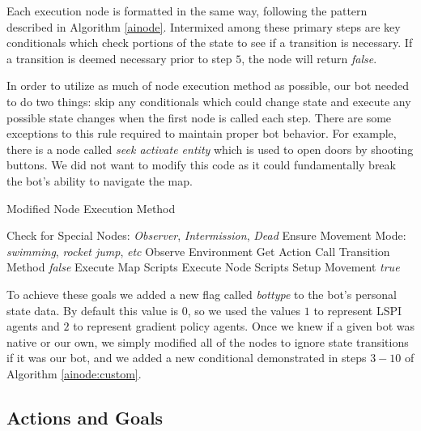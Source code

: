Each execution node is formatted in the same way, following the pattern described in Algorithm \ref{ainode}. Intermixed among these primary steps are key conditionals which check portions of the state to see if a transition is necessary. If a transition is deemed necessary prior to step $5$, the node will return \emph{false}.

In order to utilize as much of node execution method as possible, our bot needed to do two things: skip any conditionals which could change state and execute any possible state changes when the first node is called each step. There are some exceptions to this rule required to maintain proper bot behavior. For example, there is a node called \emph{seek activate entity} which is used to open doors by shooting buttons. We did not want to modify this code as it could fundamentally break the bot's ability to navigate the map.

\begin{algorithm}
\caption{Modified Node Execution Method}
\label{ainode:custom}
    {\fontsize{12}{10}\selectfont
    \begin{algorithmic}[1]
        \STATE Check for Special Nodes: \emph{Observer}, \emph{Intermission}, \emph{Dead}
        \STATE Ensure Movement Mode: \emph{swimming}, \emph{rocket jump}, \emph{etc}
            \STATE Observe Environment
            \STATE Get Action
                \STATE Call Transition Method
                \RETURN \emph{false}
            \ENDIF
        \ENDIF
        \STATE Execute Map Scripts
        \STATE Execute Node Scripts
        \STATE Setup Movement
        \RETURN \emph{true}
    \end{algorithmic}
    }
\end{algorithm}

To achieve these goals we added a new flag called \emph{bottype} to the bot's personal state data. By default this value is $0$, so we used the values $1$ to represent LSPI agents and $2$ to represent gradient policy agents. Once we knew if a given bot was native or our own, we simply modified all of the nodes to ignore state transitions if it was our bot, and we added a new conditional demonstrated in steps $3-10$ of Algorithm \ref{ainode:custom}.

\subsection{Actions and Goals}

